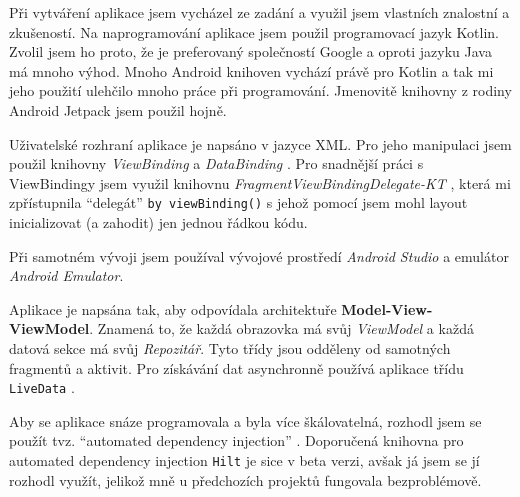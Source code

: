 \documentclass[../TakeYourPill.tex]{subfiles}
\begin{document}
Při vytváření aplikace jsem vycházel ze zadání a využil jsem vlastních znalostní a zkušeností. Na naprogramování aplikace jsem použil programovací jazyk Kotlin. Zvolil jsem ho proto, že je preferovaný společností Google a oproti jazyku Java má mnoho výhod. Mnoho Android knihoven vychází právě pro Kotlin a tak mi jeho použití ulehčilo mnoho práce při programování. Jmenovitě knihovny z rodiny Android Jetpack \cite{jetpack} jsem použil hojně.

Uživatelské rozhraní aplikace je napsáno v jazyce XML. Pro jeho manipulaci jsem použil knihovny \textit{ViewBinding} \cite{viewbinding} a \textit{DataBinding} \cite{databinding}. Pro snadnější práci s ViewBindingy jsem využil knihovnu \textit{FragmentViewBindingDelegate-KT} \cite{delegate}\cite{delegate2}, která mi zpřístupnila \enquote{delegát} \texttt{by viewBinding()} s jehož pomocí jsem mohl layout inicializovat (a zahodit) jen jednou řádkou kódu.

Při samotném vývoji jsem používal vývojové prostředí \textit{Android Studio} \cite{studio} a emulátor \textit{Android Emulator}.

Aplikace je napsána tak, aby odpovídala architektuře \textbf{Model-View-ViewModel}. Znamená to, že každá obrazovka má svůj \textit{ViewModel} a každá datová sekce má svůj \textit{Repozitář}. Tyto třídy jsou odděleny od samotných fragmentů a aktivit. Pro získávání dat asynchronně používá aplikace třídu \texttt{LiveData} \cite{livedata}.






Aby se aplikace snáze programovala a byla více škálovatelná, rozhodl jsem se použít tvz. \enquote{automated dependency injection} \cite{di}. Doporučená knihovna pro automated dependency injection \texttt{Hilt} \cite{hilt} je sice v beta verzi, avšak já jsem se jí rozhodl využít, jelikož mně u předchozích projektů fungovala bezproblémově.


\end{document}
